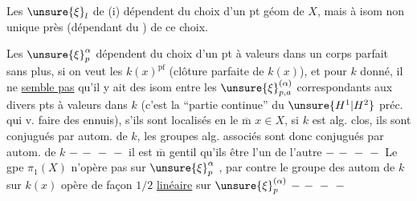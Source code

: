 Les $\unsure{\xi}_l$ de (i) dépendent du choix d'un pt géom de $X$,
mais à isom non unique près (dépendant du
) 
  de ce choix.

Les $\unsure{\xi}_p^\alpha$ dépendent du choix d'un  pt
à valeurs dans un corps parfait sans plus,
si on veut les $k(x)^{\mathrm{pf}}$ (clôture parfaite de $k(x)$),
et pour $k$ donné, il ne \uline{semble pas} qu'il y ait
 des isom entre les $\unsure{\xi}_{p,a}^{(\alpha)}$ correspondants
aux divers pts à valeurs dans $k$ (c'est la
``partie continue'' du $\unsure{H^1|H^2}$ préc. qui v. faire des
ennuis), s'ils sont localisés en le $\overline{\mathrm m}$ $x\in X$, 
 si $k$ est alg. clos, ils sont conjugués par
autom. de $k$, les groupes alg. associés sont
donc conjugués par autom. de $k$ $-\, -\, -\, -$ il est $\overline{\mathrm m}$
gentil qu'ils  être l'un  de
l'autre $-\, -\, -\, -$ Le gpe $\pi_1(X)$ n'opère pas sur $\unsure{\xi}_p^\alpha$
, par
contre le groupe des autom de $k$ sur $k(x)$
opère de façon $1/2$ \uline{linéaire} sur $\unsure{\xi}_p^{(\alpha)}$ $-\, -\, -\, -$
\margin{[\unsure{En une descente}
\figure{\begin{tikzpicture}[baseline=-.4ex,scale=.22]\draw (0,0)--(1,2);\draw (0,0) circle (.18);\end{tikzpicture}}}



